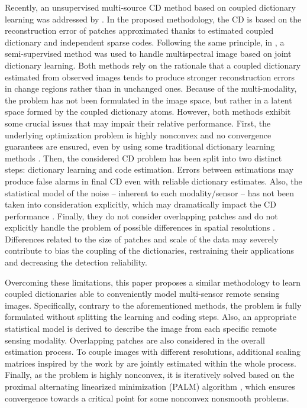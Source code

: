 \documentclass[review]{elsarticle}
\begin{document}
Recently, an unsupervised multi-source CD method based on coupled dictionary learning was addressed by \citet{gong_coupled_2016}. In the proposed methodology, the CD is based on the reconstruction error of patches approximated thanks to estimated coupled dictionary and independent sparse codes. Following the same principle, in \citet{lu_joint_2017}, a semi-supervised method was used to handle multispectral image based on joint dictionary learning. Both methods rely on the rationale that a coupled dictionary estimated from observed images tends to produce stronger reconstruction errors in change regions rather than in unchanged ones. Because of the multi-modality, the problem has not been formulated in the image space, but rather in a latent space formed by the coupled dictionary atoms. However, both methods exhibit some crucial issues that may impair their relative performance. First, the underlying optimization problem is highly nonconvex and no convergence guarantees are ensured, even by using some traditional dictionary learning methods \citep{aharon_k-svd_2006}. Then, the considered CD problem has been split into two distinct steps: dictionary learning and code estimation. Errors between estimations may produce false alarms in final CD even with reliable dictionary estimates. Also, the statistical model of the noise -- inherent to each modality/sensor -- has not been taken into consideration explicitly, which may dramatically impact the CD performance \citep{campbell_introduction_2011}. Finally, they do not consider  overlapping patches and do not explicitly handle the problem of possible differences in spatial resolutions \citep{ferraris_robust_2017,ferraris_detecting_2017}. Differences related to the size of patches and scale of the data may severely contribute to bias the coupling of the dictionaries, restraining their applications and decreasing the detection reliability.

Overcoming these limitations, this paper proposes a similar methodology to learn coupled dictionaries able to conveniently model multi-sensor remote sensing images. Specifically, contrary to the aforementioned methods, the problem is fully formulated without splitting the learning and coding steps. Also, an appropriate statistical model is derived to describe the image from each specific remote sensing modality. Overlapping patches are also considered in the overall estimation process. To couple images with different resolutions, additional scaling matrices inspired by the work by \citet{seichepine_soft_2014} are jointly estimated within the whole process. Finally, as the problem is highly nonconvex, it is iteratively solved based on the proximal alternating linearized minimization (PALM) algorithm \citep{bolte_proximal_2014}, which ensures convergence towards a  critical point for some nonconvex nonsmooth problems.
\end{document}
